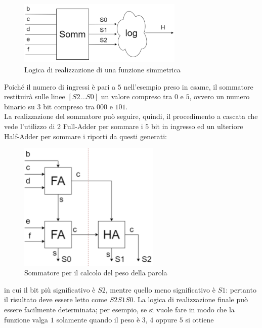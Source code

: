 \documentclass[a4paper]{extarticle}
\begin{document}
\begin{figure}[H]
    \centering
    \includegraphics[width=0.7\textwidth]{logica-realizzazione-funzione-simmetrica.png}
    \caption{Logica di realizzazione di una funzione simmetrica}
    \label{fig:logica_realizzazione_funzione_simmetrica}
\end{figure}

\noindent
Poiché il numero di ingressi è pari a $5$ nell'esempio preso in esame, il sommatore restituirà sulle linee $[S2 \dots S0]$ un valore compreso tra $0$ e $5$, ovvero un numero binario su $3$ bit compreso tra $000$ e $101$.\\
La realizzazione del sommatore può seguire, quindi, il procedimento a cascata che vede l'utilizzo di 2 Full-Adder per sommare i $5$ bit in ingresso ed un ulteriore Half-Adder per sommare i riporti da questi generati:

\begin{figure}[H]
    \centering
    \includegraphics[width=0.6\textwidth]{sommatore-calcolo-peso-parola.png}
    \caption{Sommatore per il calcolo del peso della parola}
    \label{fig:sommatore_calcolo_peso_parola}
\end{figure}

\noindent
in cui il bit più significativo è $S2$, mentre quello meno significativo è $S1$: pertanto il risultato deve essere letto come $S2 S1 S0$. La logica di realizzazione finale può essere facilmente determinata; per esempio, se si vuole fare in modo che la funzione valga $1$ solamente quando il peso è $3$, $4$ oppure $5$ si ottiene
\end{document}
